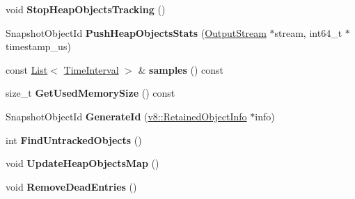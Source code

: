 \begin{DoxyCompactItemize}
\item 
void {\bfseries Stop\+Heap\+Objects\+Tracking} ()\hypertarget{classv8_1_1internal_1_1_heap_objects_map_a73ec46f75f7c486e3fcec5643766c442}{}\label{classv8_1_1internal_1_1_heap_objects_map_a73ec46f75f7c486e3fcec5643766c442}

\item 
Snapshot\+Object\+Id {\bfseries Push\+Heap\+Objects\+Stats} (\hyperlink{classv8_1_1_output_stream}{Output\+Stream} $\ast$stream, int64\+\_\+t $\ast$timestamp\+\_\+us)\hypertarget{classv8_1_1internal_1_1_heap_objects_map_a814bf7c07146cb91a42206cfcb71d7bf}{}\label{classv8_1_1internal_1_1_heap_objects_map_a814bf7c07146cb91a42206cfcb71d7bf}

\item 
const \hyperlink{classv8_1_1internal_1_1_list}{List}$<$ \hyperlink{structv8_1_1internal_1_1_heap_objects_map_1_1_time_interval}{Time\+Interval} $>$ \& {\bfseries samples} () const \hypertarget{classv8_1_1internal_1_1_heap_objects_map_a302771baf774c40691420f96a63e5f27}{}\label{classv8_1_1internal_1_1_heap_objects_map_a302771baf774c40691420f96a63e5f27}

\item 
size\+\_\+t {\bfseries Get\+Used\+Memory\+Size} () const \hypertarget{classv8_1_1internal_1_1_heap_objects_map_ac0ecf41525d2e97dd56303ece9f54edf}{}\label{classv8_1_1internal_1_1_heap_objects_map_ac0ecf41525d2e97dd56303ece9f54edf}

\item 
Snapshot\+Object\+Id {\bfseries Generate\+Id} (\hyperlink{classv8_1_1_retained_object_info}{v8\+::\+Retained\+Object\+Info} $\ast$info)\hypertarget{classv8_1_1internal_1_1_heap_objects_map_a246be15ede06e7dd8211be57c67b140c}{}\label{classv8_1_1internal_1_1_heap_objects_map_a246be15ede06e7dd8211be57c67b140c}

\item 
int {\bfseries Find\+Untracked\+Objects} ()\hypertarget{classv8_1_1internal_1_1_heap_objects_map_a53220f38cefe35e6b7acf5da451ee2ff}{}\label{classv8_1_1internal_1_1_heap_objects_map_a53220f38cefe35e6b7acf5da451ee2ff}

\item 
void {\bfseries Update\+Heap\+Objects\+Map} ()\hypertarget{classv8_1_1internal_1_1_heap_objects_map_af0743759fc64433e0a2b207168dfb566}{}\label{classv8_1_1internal_1_1_heap_objects_map_af0743759fc64433e0a2b207168dfb566}

\item 
void {\bfseries Remove\+Dead\+Entries} ()\hypertarget{classv8_1_1internal_1_1_heap_objects_map_a11421eef0d71d30bee53d0112e19efeb}{}\label{classv8_1_1internal_1_1_heap_objects_map_a11421eef0d71d30bee53d0112e19efeb}

\end{DoxyCompactItemize}
